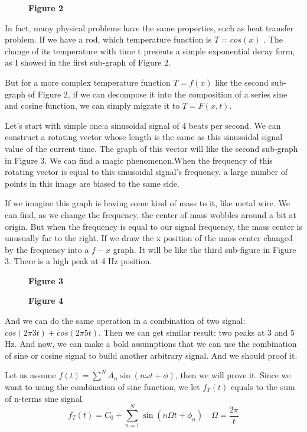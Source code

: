\documentclass[margin,line]{res}
\begin{document}
\begin{resume}
\begin{figure}[H]
\begin{minipage}{0.55\linewidth}
    \centerline{\textbf{Figure 2}}
  \end{minipage}
\end{figure}
In fact, many physical problems have the same properties, such as heat transfer problem. If we have a rod, which temperature function is $T=cos(x)$ .
The change of its temperature with time t presents a simple exponential decay form, as I showed in the first sub-graph of Figure 2.\par
But for a more complex temperature function $T=f(x)$ like the second sub-graph of Figure 2, if we can decompose it into the composition of a series sine and cosine function, we can simply migrate it to $T=F(x,t)$.\par
Let's start with simple one:a sinusoidal signal of 4 beats per second. We can construct a rotating vector whose length is the same as this sinusoidal signal value of the current time. The graph of this vector will like the second sub-graph in Figure 3. We can find a magic phenomenon.When the frequency of this rotating vector is equal to this sinusoidal signal's frequency, a large number of points in this image are biased to the same side.\par
If we imagine this graph is having some kind of mass to it, like metal wire. We can find, as we change the frequency, the center of mass wobbles around a bit at origin. But when the frequency is equal to our signal frequency, the mass center is unusually far to the right. If we draw the x position of the mass center changed by the frequency into a $f-x$ graph. It will be like the third sub-figure in Figure 3. There is a high peak at 4 Hz position.\par
\begin{figure}[H]
	\begin{minipage}{0.48\linewidth}
		\centerline{}
		\centerline{\textbf{Figure 3}}
	\end{minipage}
	\begin{minipage}{0.48\linewidth}
		\centerline{}
		\centerline{\textbf{Figure 4}}
	\end{minipage}
\end{figure}
And we can do the same operation in a combination of two signal: $cos(2\pi 3t)+cos(2\pi 5t)$. Then we can get similar result: two peaks at 3 and 5 Hz. And now, we can make a bold assumptions that we can use the combination of sine or cosine signal to build another arbitrary signal. And we should proof it.\par
Let us assume $f(t)=\sum\limits^{N}A_n \sin (n\omega t+\phi)$, then we will prove it.
Since we want to using the combination of sine function, we let $f_T(t)$ equals to the sum of n-terms sine signal.
$$
f_T(t)=C_0+\sum\limits_{n=1}^N{\sin(n\Omega t+\phi_{n} ) } \quad \Omega=\frac{2\pi}{t}
$$


\end{resume}
\end{document}
